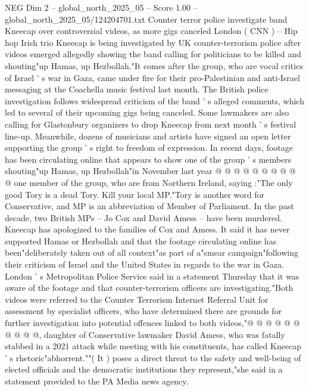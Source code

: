 \begin{textsample}{NEG Dim 2 – global\_north\_2025\_05 – Score 1.00 – global\_north\_2025\_05/124204701.txt}  \label{ex:f2_neg_039}
Counter terror police investigate band Kneecap over controversial videos, as more gigs canceled London ( CNN ) -- Hip hop Irish trio Kneecap is being investigated by UK counter-terrorism police after videos emerged allegedly showing the band calling for politicians to be killed and shouting"up Hamas, up Hezbollah."It comes after the group, who are vocal critics of Israel ' s war in Gaza, came under fire for their pro-Palestinian and anti-Israel messaging at the Coachella music festival last month.
The British police investigation follows widespread criticism of the band ' s alleged comments, which led to several of their upcoming gigs being canceled.
Some lawmakers are also calling for Glastonbury organizers to drop Kneecap from next month ' s festival line-up.
Meanwhile, dozens of musicians and artists have signed an open letter supporting the group ' s right to freedom of expression.
In recent days, footage has been circulating online that appears to show one of the group ' s members shouting"up Hamas, up Hezbollah"in November last year @ @ @ @ @ @ @ @ @ @ one member of the group, who are from Northern Ireland, saying :"The only good Tory is a dead Tory.
Kill your local MP."Tory is another word for Conservative, and MP is an abbreviation of Member of Parliament.
In the past decade, two British MPs -- Jo Cox and David Amess -- have been murdered.
Kneecap has apologized to the families of Cox and Amess.
It said it has never supported Hamas or Hezbollah and that the footage circulating online has been"deliberately taken out of all context"as part of a"smear campaign"following their criticism of Israel and the United States in regards to the war in Gaza.
London ' s Metropolitan Police Service said in a statement Thursday that it was aware of the footage and that counter-terrorism officers are investigating."Both videos were referred to the Counter Terrorism Internet Referral Unit for assessment by specialist officers, who have determined there are grounds for further investigation into potential offences linked to both videos,"@ @ @ @ @ @ @ @ @ @, daughter of Conservative lawmaker David Amess, who was fatally stabbed in a 2021 attack while meeting with his constituents, has called Kneecap ' s rhetoric"abhorrent.""( It ) poses a direct threat to the safety and well-being of elected officials and the democratic institutions they represent,"she said in a statement provided to the PA Media news agency.

\end{textsample}
